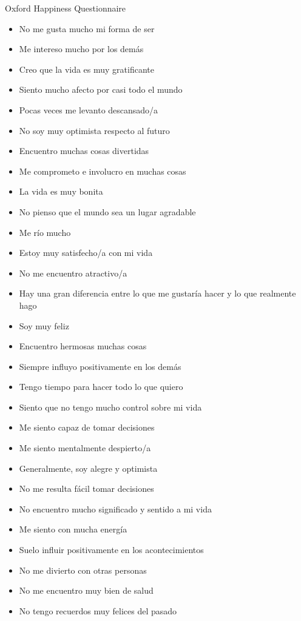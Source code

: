 \documentclass[conference]{IEEEtran}
\begin{document}
Oxford Happiness Questionnaire\\
\begin{itemize}
\item 	No me gusta mucho mi forma de ser
\item 	Me intereso mucho por los demás
\item 	Creo que la vida es muy gratificante
\item 	Siento mucho afecto por casi todo el mundo
\item 	Pocas veces me levanto descansado/a
\item 	No soy muy optimista respecto al futuro
\item 	Encuentro muchas cosas divertidas
\item 	Me comprometo e involucro en muchas cosas
\item 	La vida es muy bonita
\item 	No pienso que el mundo sea un lugar agradable
\item 	Me río mucho
\item 	Estoy muy satisfecho/a con mi vida
\item 	No me encuentro atractivo/a
\item 	Hay una gran diferencia entre lo que me gustaría hacer y lo que realmente hago
\item 	Soy muy feliz
\item 	Encuentro hermosas muchas cosas
\item 	Siempre influyo positivamente en los demás
\item 	Tengo tiempo para hacer todo lo que quiero
\item 	Siento que no tengo mucho control sobre mi vida
\item 	Me siento capaz de tomar decisiones
\item 	Me siento mentalmente despierto/a
\item 	Generalmente, soy alegre y optimista
\item 	No me resulta fácil tomar decisiones
\item 	No encuentro mucho significado y sentido a mi vida
\item 	Me siento con mucha energía
\item 	Suelo influir positivamente en los acontecimientos
\item 	No me divierto con otras personas
\item 	No me encuentro muy bien de salud
\item 	No tengo recuerdos muy felices del pasado
\end{itemize}
\end{document}
